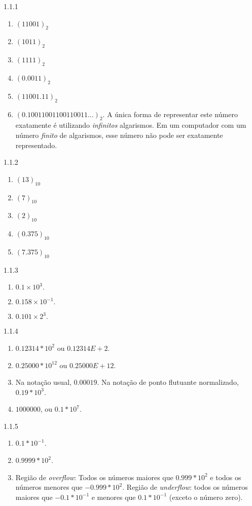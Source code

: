 \begin{Solucao}{1.1.1}
\begin{enumerate}[label=\alph*)]
\item $(11001)_2$
\item $(1011)_2$
\item $(1111)_2$
\item $(0.0011)_2$
\item $(11001.11)_2$
\item $(0.10011001100110011...)_2.$ A única forma de representar este número exatamente é utilizando \emph{infinitos} algarismos. Em um computador com um número \emph{finito} de algarismos, esse número não pode ser exatamente representado.
\end{enumerate}
\end{Solucao}
\begin{Solucao}{1.1.2}
\begin{enumerate}[label=\alph*)]
\item $(13)_{10}$
\item $(7)_{10}$
\item $(2)_{10}$
\item $(0.375)_{10}$
\item $(7.375)_{10}$
\end{enumerate}
\end{Solucao}
\begin{Solucao}{1.1.3}
\begin{enumerate}[label=\alph*)]
\item $0.1\times 10^3.$
\item $0.158\times 10^{-1}.$
\item $0.101\times 2^3.$
\end{enumerate}
\end{Solucao}
\begin{Solucao}{1.1.4}
\begin{enumerate}[label=\alph*)]
\item $0.12314*10^2$ ou $0.12314E+2$.
\item $0.25000*10^{12}$ ou $0.25000E+12$.
\item Na notação usual, $0.00019$. Na notação de ponto flutuante normalizado, $0.19*10^3$.
\item $1000000$, ou $0.1*10^7$.
\end{enumerate}
\end{Solucao}
\begin{Solucao}{1.1.5}
\begin{enumerate}
[label=\alph*)]
\item $0.1*10^{-1}$.
\item $0.9999*10^2$.
\item Região de \emph{overflow}: Todos os números maiores que $0.999*10^2$ e todos os números menores que $-0.999*10^2$. Região de \emph{underflow}: todos os números maiores que $-0.1*10^{-1}$ e menores que $0.1*10^{-1}$ (exceto o número zero).
\end{enumerate}
\end{Solucao}
